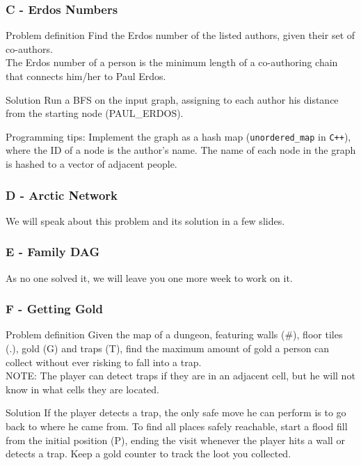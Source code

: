 \documentclass{beamer}
\begin{document}
  \begin{frame}
    \frametitle{C - Erdos Numbers}
    \begin{block}{Problem definition}
      Find the Erdos number of the listed authors, given their set of co-authors.\\
      The Erdos number of a person is the minimum length of a co-authoring chain that connects him/her to Paul Erdos.
    \end{block}
    \pause
    \begin{block}{Solution}
      Run a BFS on the input graph, assigning to each author his distance from the starting node (PAUL\_ERDOS).
    \end{block}
    \alert{Programming tips:} Implement the graph as a hash map (\texttt{unordered\_map} in \texttt{C++}), where the ID of a node is the author's name.
    The name of each node in the graph is hashed to a vector of adjacent people.
  \end{frame}

  \begin{frame}
    \frametitle{D - Arctic Network}
    \begin{LARGE}
      \begin{center}
        We will speak about this problem and its solution in a few slides.
      \end{center}
    \end{LARGE}
  \end{frame}

  \begin{frame}
    \frametitle{E - Family DAG}
    \begin{LARGE}
      \begin{center}
        As no one solved it, we will leave you one more week to work on it.
      \end{center}
    \end{LARGE}
  \end{frame}

  \begin{frame}
    \frametitle{F - Getting Gold}
    \begin{block}{Problem definition}
      Given the map of a dungeon, featuring walls (\#), floor tiles (.), gold (G) and traps (T), find the maximum amount of gold a person can collect
      without ever risking to fall into a trap.\\
      \alert{NOTE:} The player can detect traps if they are in an adjacent cell, but he will not know in what cells they are located.
    \end{block}
    \pause
    \begin{block}{Solution}
      If the player detects a trap, the only safe move he can perform is to go back to where he came from.
      To find all places safely reachable, start a flood fill from the initial position (P), ending the visit whenever the player hits a wall or detects a trap.
      Keep a gold counter to track the loot you collected.
    \end{block}
  \end{frame}
  
\end{document}
